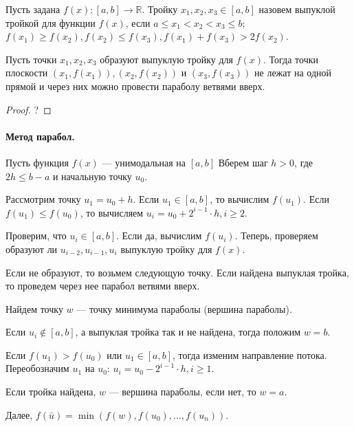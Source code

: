 
\begin{definition}
	Пусть задана $f(x): [a, b] \to \mathbb{R}$. Тройку $x_1, x_2, x_3 \in [a, b]$ назовем выпуклой тройкой для функции $f(x)$, если $a \leqslant x_1 < x_2 < x_3 \leqslant b$; $f(x_1) \geqslant f(x_2), f(x_2) \leqslant f(x_3), f(x_1) + f(x_3) > 2 f(x_2)$. 
\end{definition}

\begin{utv}
	Пусть точки $x_1, x_2, x_3$ образуют выпуклую тройку для $f(x)$. Тогда точки плоскости $(x_1, f(x_1)), (x_2, f(x_2))$ и $(x_3, f(x_3))$ не лежат на одной прямой и через них можно провести параболу ветвями вверх. 
\end{utv}
\begin{proof}
	? %
\end{proof}

\paragraph{Метод парабол.} Пусть функция $f(x)$ --- унимодальная на $[a, b]$ Вберем шаг $h > 0$, где $2 h \leqslant b - a$ и начальную точку $u_0$.

Рассмотрим точку $u_1 = u_0 + h$. Если $u_1 \in [a, b]$, то вычислим $f(u_1)$. Если $f(u_1) \leqslant f(u_0)$, то вычисляем $u_i = u_0 + 2^{i - 1} \cdot h, i \geqslant 2$. 

Проверим, что $u_i \in [a, b]$. Если да, вычислим $f(u_i)$. Теперь, проверяем образуют ли $u_{i - 2}, u_{i - 1}, u_i$ выпуклую тройку для $f(x)$.

Если не образуют, то возьмем следующую точку. Если найдена выпуклая тройка, то проведем через нее парабол ветвями вверх. 

Найдем точку $w$ --- точку минимума параболы (вершина параболы). 

Если $u_i \not \in [a, b]$, а выпуклая тройка так и не найдена, тогда положим $w = b$. 

Если $f(u_1) > f(u_0)$ или $u_1 \in [a, b]$, тогда изменим направление потока. Переобозначим $u_1$ на $u_0$: $u_i = u_0 - 2^{i - 1} \cdot h, i \geqslant 1$.

Если тройка найдена, $w$ --- вершина параболы, если нет, то $w = a$. 

Далее, $f(\bar{u}) = \min(f(w), f(u_0), \dotsc, f(u_n))$.